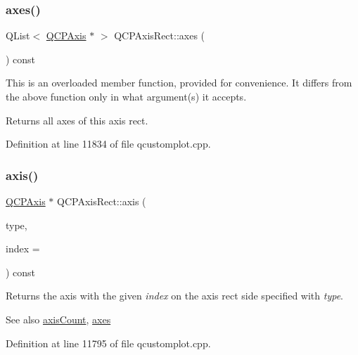 \subsubsection{\texorpdfstring{axes()}{axes()}\hspace{0.1cm}{\footnotesize\ttfamily [2/2]}}
{\footnotesize\ttfamily Q\+List$<$ \hyperlink{class_q_c_p_axis}{Q\+C\+P\+Axis} $\ast$ $>$ Q\+C\+P\+Axis\+Rect\+::axes (\begin{DoxyParamCaption}{ }\end{DoxyParamCaption}) const}

This is an overloaded member function, provided for convenience. It differs from the above function only in what argument(s) it accepts.

Returns all axes of this axis rect. 

Definition at line 11834 of file qcustomplot.\+cpp.

\mbox{\label{class_q_c_p_axis_rect_a583ae4f6d78b601b732183f6cabecbe1}} 
\subsubsection{\texorpdfstring{axis()}{axis()}}
{\footnotesize\ttfamily \hyperlink{class_q_c_p_axis}{Q\+C\+P\+Axis} $\ast$ Q\+C\+P\+Axis\+Rect\+::axis (\begin{DoxyParamCaption}\item[{\hyperlink{class_q_c_p_axis_ae2bcc1728b382f10f064612b368bc18a}{Q\+C\+P\+Axis\+::\+Axis\+Type}}]{type,  }\item[{int}]{index = {} }\end{DoxyParamCaption}) const}

Returns the axis with the given {\itshape index} on the axis rect side specified with {\itshape type}.

\begin{DoxySeeAlso}{See also}
\hyperlink{class_q_c_p_axis_rect_a85b321acec0f694d8b5fdeafdbff3133}{axis\+Count}, \hyperlink{class_q_c_p_axis_rect_a8db4722cb93e9c4a6f0d91150c200867}{axes} 
\end{DoxySeeAlso}


Definition at line 11795 of file qcustomplot.\+cpp.

\mbox{\label{class_q_c_p_axis_rect_a85b321acec0f694d8b5fdeafdbff3133}} 
